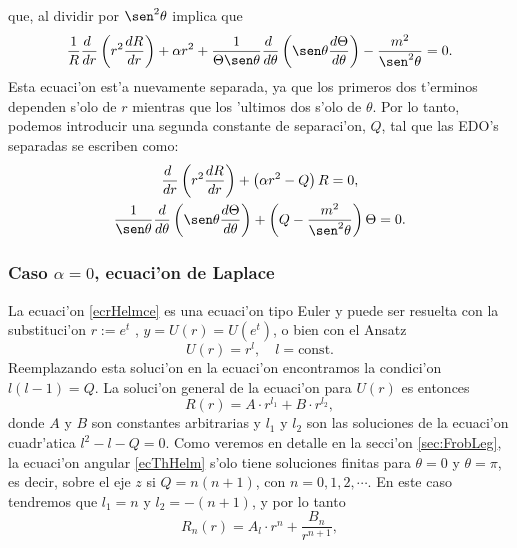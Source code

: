 que, al dividir por $\sen^2\theta$ implica que
\begin{equation}
\frac{1}{R}\frac{d\ }{dr}\left(r^2\frac{dR}{dr}\right)+\alpha r^2
+\frac{1}{\Theta\sen\theta}\frac{d\ }{d\theta}\left(\sen\theta\frac{
d\Theta}{d\theta}\right) -\frac{m^2}{\sen^2\theta} = 0.
 \end{equation}
Esta ecuaci'on est'a nuevamente separada, ya que los primeros dos t'erminos dependen s'olo de $r$ mientras que los 'ultimos dos s'olo de $\theta$. Por lo tanto, podemos introducir una segunda constante de separaci'on, $Q$, tal que las EDO's separadas se escriben como:
\begin{gather}
\frac{d\ }{dr}\left(r^2\frac{dR}{dr}\right)+\left(\alpha r^2-Q\right)R=0, \label{ecrHelmce}\\
\frac{1}{\sen\theta}\frac{d}{d\theta}\left(\sen\theta\frac{d\Theta}{d\theta}\right)
+\left(Q-\frac{m^2}{\sen^2\theta}\right) \Theta = 0. \label{ecThHelm}
\end{gather}

\subsubsection{Caso $\alpha=0$, ecuaci'on de Laplace}
 La ecuaci'on \eqref{ecrHelmce} es una ecuaci'on tipo Euler y puede ser resuelta con la
substituci'on $r:=e^t$ , $y=U(r)=U(e^t)$, o bien con el Ansatz
 \begin{equation}
  U(r) = r^l,\quad l=\text{const.}
\end{equation}
  Reemplazando esta soluci'on en la ecuaci'on encontramos la condici'on
 $l(l-1)=Q$. La soluci'on general de la ecuaci'on para $U(r)$ es entonces
\begin{equation}
 R(r) = A\cdot r^{l_1} + B\cdot r^{l_2},\label{loes2}
\end{equation}
donde $A$ y $B$ son constantes arbitrarias y $l_1$ y $l_2$ son las soluciones de la ecuaci'on cuadr'atica $l^2-l-Q=0$. Como veremos en detalle en la secci'on \ref{sec:FrobLeg}, la ecuaci'on angular \eqref{ecThHelm} s'olo tiene soluciones finitas para $\theta=0$ y $\theta=\pi$, es decir, sobre el eje $z$ si $Q=n(n+1)$, con $n=0,1,2,\cdots$. En este caso tendremos que $l_1=n$ y $l_2=-(n+1)$, y por lo tanto
\begin{equation}
R_n(r) = A_l\cdot r^n + \frac{B_n}{r^{n+1}},\label{Rn}
\end{equation}


